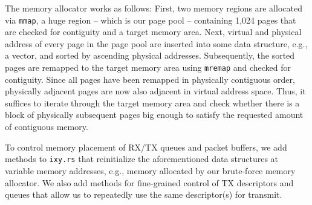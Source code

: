 The memory allocator works as follows: First, two memory regions are allocated
via \texttt{mmap}, a huge region -- which is our page pool -- containing 1,024
pages that are checked for contiguity and a target memory area. Next, virtual
and physical address of every page in the page pool are inserted into some data
structure, e.g., a vector, and sorted by ascending physical addresses.
Subsequently, the sorted pages are remapped to the target memory area using
\texttt{mremap} and checked for contiguity. Since all pages have been remapped
in physically contiguous order, physically adjacent pages are now also adjacent
in virtual address space. Thus, it suffices to iterate through the target memory
area and check whether there is a block of physically subsequent pages big
enough to satisfy the requested amount of contiguous memory.

To control memory placement of RX/TX queues and packet buffers, we add methods
to \texttt{ixy.rs} that reinitialize the aforementioned data structures at
variable memory addresses, e.g., memory allocated by our brute-force memory
allocator. We also add methods for fine-grained control of TX descriptors and
queues that allow us to repeatedly use the same descriptor(s) for transmit.

